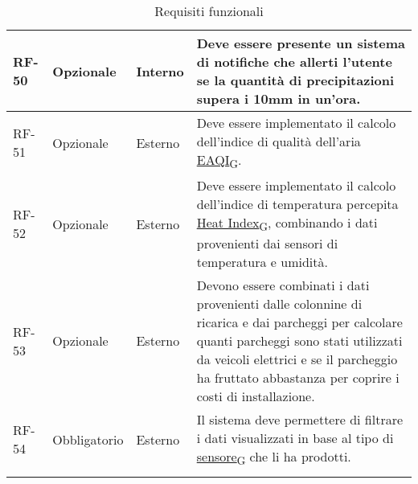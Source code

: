 \begin{longtable}{|>{\centering\arraybackslash}m{}|>{\centering\arraybackslash}m{}|>{\centering\arraybackslash}m{}|>{\centering\arraybackslash}m{}|}
	\\\hline
	RF-50           & Opzionale           & Interno                                                                                                           & Deve essere presente un sistema di notifiche che allerti l'utente se la quantità di precipitazioni supera i 10mm in un'ora.
	\\\hline
	RF-51           & Opzionale           & Esterno                                                                                                           & Deve essere implementato il calcolo dell'indice di qualità dell'aria \href{https://7last.github.io/docs/pb/documentazione-interna/glossario\#european-air-quality-index}{EAQI\textsubscript{G}}.
	\\\hline
	RF-52           & Opzionale           & Esterno                                                                                                           & Deve essere implementato il calcolo dell'indice di temperatura percepita \href{https://7last.github.io/docs/pb/documentazione-interna/glossario\#heat-index}{Heat Index\textsubscript{G}}, combinando i dati provenienti dai sensori di temperatura e umidità.
	\\\hline
	RF-53           & Opzionale           & Esterno                                                                                                           & Devono essere combinati i dati provenienti dalle colonnine di ricarica e dai parcheggi per calcolare quanti parcheggi sono stati utilizzati da veicoli elettrici e se il parcheggio ha fruttato abbastanza per coprire i costi di installazione.
	\\\hline
	RF-54           & Obbligatorio        & Esterno                                                                                                           & Il sistema deve permettere di filtrare i dati visualizzati in base al tipo di \href{https://7last.github.io/docs/pb/documentazione-interna/glossario\#sensore}{sensore\textsubscript{G}} che li ha prodotti.
	\\\hline
	\caption{Requisiti funzionali}
\end{longtable}

\newpage

